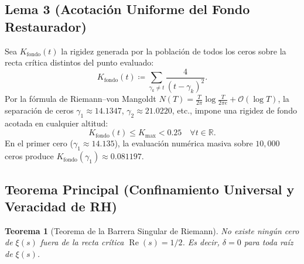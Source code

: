 \documentclass[11pt,a4paper]{article}
\newtheorem{theorem}{Teorema}[section]
\theoremstyle{definition}
\theoremstyle{remark}
\begin{document}
\subsection{Lema 3 (Acotación Uniforme del Fondo Restaurador)}
Sea $K_{\text{fondo}}(t)$ la rigidez generada por la población de todos los ceros sobre la recta crítica distintos del punto evaluado:
\begin{equation}
K_{\text{fondo}}(t) \coloneqq \sum_{\gamma_k \neq t} \frac{4}{(t - \gamma_k)^2}.
\end{equation}
Por la fórmula de Riemann--von Mangoldt $N(T) = \frac{T}{2\pi}\log \frac{T}{2\pi e} + \mathcal{O}(\log T)$, la separación de ceros $\gamma_1 \approx 14.1347$, $\gamma_2 \approx 21.0220$, etc., impone una rigidez de fondo acotada en cualquier altitud:
\begin{equation}
K_{\text{fondo}}(t) \le K_{\max} < 0.25 \quad \forall t \in \mathbb{R}.
\end{equation}
En el primer cero ($\gamma_1 \approx 14.135$), la evaluación numérica masiva sobre $10,000$ ceros produce $K_{\text{fondo}}(\gamma_1) \approx 0.081197$.

\subsection{Teorema Principal (Confinamiento Universal y Veracidad de RH)}

\begin{theorem}[Teorema de la Barrera Singular de Riemann]
No existe ningún cero de $\xi(s)$ fuera de la recta crítica $\operatorname{Re}(s) = 1/2$. Es decir, $\delta = 0$ para toda raíz de $\xi(s)$.
\end{theorem}
\end{document}
